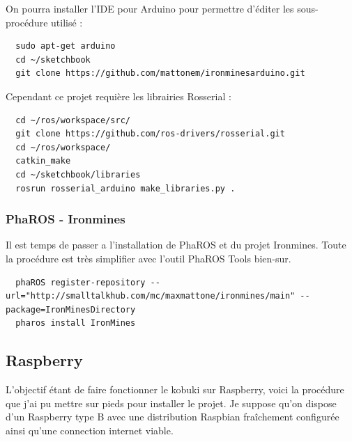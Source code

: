 \documentclass[a4paper, 11pt]{article}
\begin{document}
On pourra installer l'IDE pour Arduino pour permettre d'éditer les
sous-procédure utilisé : 
\begin{lstlisting}
  sudo apt-get arduino
  cd ~/sketchbook
  git clone https://github.com/mattonem/ironminesarduino.git
\end{lstlisting}
Cependant ce projet requière les librairies Rosserial :
\begin{lstlisting}
  cd ~/ros/workspace/src/
  git clone https://github.com/ros-drivers/rosserial.git
  cd ~/ros/workspace/
  catkin_make
  cd ~/sketchbook/libraries
  rosrun rosserial_arduino make_libraries.py .
\end{lstlisting}

\subsubsection{PhaROS - Ironmines}
Il est temps de passer a l'installation de PhaROS et du projet
Ironmines. Toute la procédure est très simplifier avec l'outil PhaROS
Tools bien-sur.

\begin{lstlisting}
  phaROS register-repository --url="http://smalltalkhub.com/mc/maxmattone/ironmines/main" --package=IronMinesDirectory
  pharos install IronMines
\end{lstlisting}

\subsection{Raspberry}
L'objectif étant de faire fonctionner le kobuki sur Raspberry, voici
la procédure que j'ai pu mettre sur pieds pour installer le projet. Je
suppose qu'on dispose d'un Raspberry type B avec une distribution
Raspbian fraîchement configurée ainsi qu'une connection internet
viable.
\end{document}
